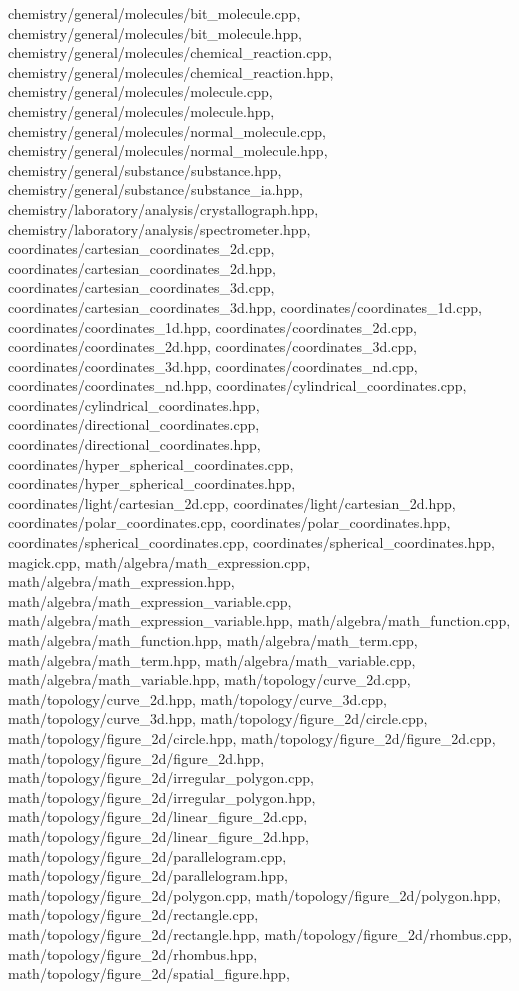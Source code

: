 \begin{DoxyVerb}
chemistry/general/molecules/bit_molecule.cpp,
chemistry/general/molecules/bit_molecule.hpp,
chemistry/general/molecules/chemical_reaction.cpp,
chemistry/general/molecules/chemical_reaction.hpp,
chemistry/general/molecules/molecule.cpp,
chemistry/general/molecules/molecule.hpp,
chemistry/general/molecules/normal_molecule.cpp,
chemistry/general/molecules/normal_molecule.hpp,
chemistry/general/substance/substance.hpp,
chemistry/general/substance/substance_ia.hpp,
chemistry/laboratory/analysis/crystallograph.hpp,
chemistry/laboratory/analysis/spectrometer.hpp,
coordinates/cartesian_coordinates_2d.cpp,
coordinates/cartesian_coordinates_2d.hpp,
coordinates/cartesian_coordinates_3d.cpp,
coordinates/cartesian_coordinates_3d.hpp,
coordinates/coordinates_1d.cpp, coordinates/coordinates_1d.hpp,
coordinates/coordinates_2d.cpp, coordinates/coordinates_2d.hpp,
coordinates/coordinates_3d.cpp, coordinates/coordinates_3d.hpp,
coordinates/coordinates_nd.cpp, coordinates/coordinates_nd.hpp,
coordinates/cylindrical_coordinates.cpp,
coordinates/cylindrical_coordinates.hpp,
coordinates/directional_coordinates.cpp,
coordinates/directional_coordinates.hpp,
coordinates/hyper_spherical_coordinates.cpp,
coordinates/hyper_spherical_coordinates.hpp,
coordinates/light/cartesian_2d.cpp,
coordinates/light/cartesian_2d.hpp,
coordinates/polar_coordinates.cpp,
coordinates/polar_coordinates.hpp,
coordinates/spherical_coordinates.cpp,
coordinates/spherical_coordinates.hpp, magick.cpp,
math/algebra/math_expression.cpp, math/algebra/math_expression.hpp,
math/algebra/math_expression_variable.cpp,
math/algebra/math_expression_variable.hpp,
math/algebra/math_function.cpp, math/algebra/math_function.hpp,
math/algebra/math_term.cpp, math/algebra/math_term.hpp,
math/algebra/math_variable.cpp, math/algebra/math_variable.hpp,
math/topology/curve_2d.cpp, math/topology/curve_2d.hpp,
math/topology/curve_3d.cpp, math/topology/curve_3d.hpp,
math/topology/figure_2d/circle.cpp,
math/topology/figure_2d/circle.hpp,
math/topology/figure_2d/figure_2d.cpp,
math/topology/figure_2d/figure_2d.hpp,
math/topology/figure_2d/irregular_polygon.cpp,
math/topology/figure_2d/irregular_polygon.hpp,
math/topology/figure_2d/linear_figure_2d.cpp,
math/topology/figure_2d/linear_figure_2d.hpp,
math/topology/figure_2d/parallelogram.cpp,
math/topology/figure_2d/parallelogram.hpp,
math/topology/figure_2d/polygon.cpp,
math/topology/figure_2d/polygon.hpp,
math/topology/figure_2d/rectangle.cpp,
math/topology/figure_2d/rectangle.hpp,
math/topology/figure_2d/rhombus.cpp,
math/topology/figure_2d/rhombus.hpp,
math/topology/figure_2d/spatial_figure.hpp,

\end{DoxyVerb}
